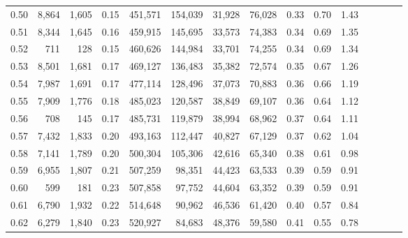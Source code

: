 \begin{tabular}{rrrcrrrrrrrrrrr}
0.50 &   8,864 &   1,605 &                                       0.15 &  451,571 &  154,039 &   31,928 &   76,028 &  0.33 &  0.70 &                         1.43 \\
0.51 &   8,344 &   1,645 &                                       0.16 &  459,915 &  145,695 &   33,573 &   74,383 &  0.34 &  0.69 &                         1.35 \\
0.52 &     711 &     128 &                                       0.15 &  460,626 &  144,984 &   33,701 &   74,255 &  0.34 &  0.69 &                         1.34 \\
0.53 &   8,501 &   1,681 &                                       0.17 &  469,127 &  136,483 &   35,382 &   72,574 &  0.35 &  0.67 &                         1.26 \\
0.54 &   7,987 &   1,691 &                                       0.17 &  477,114 &  128,496 &   37,073 &   70,883 &  0.36 &  0.66 &                         1.19 \\
0.55 &   7,909 &   1,776 &                                       0.18 &  485,023 &  120,587 &   38,849 &   69,107 &  0.36 &  0.64 &                         1.12 \\
0.56 &     708 &     145 &                                       0.17 &  485,731 &  119,879 &   38,994 &   68,962 &  0.37 &  0.64 &                         1.11 \\
0.57 &   7,432 &   1,833 &                                       0.20 &  493,163 &  112,447 &   40,827 &   67,129 &  0.37 &  0.62 &                         1.04 \\
0.58 &   7,141 &   1,789 &                                       0.20 &  500,304 &  105,306 &   42,616 &   65,340 &  0.38 &  0.61 &                         0.98 \\
0.59 &   6,955 &   1,807 &                                       0.21 &  507,259 &   98,351 &   44,423 &   63,533 &  0.39 &  0.59 &                         0.91 \\
0.60 &     599 &     181 &                                       0.23 &  507,858 &   97,752 &   44,604 &   63,352 &  0.39 &  0.59 &                         0.91 \\
0.61 &   6,790 &   1,932 &                                       0.22 &  514,648 &   90,962 &   46,536 &   61,420 &  0.40 &  0.57 &                         0.84 \\
0.62 &   6,279 &   1,840 &                                       0.23 &  520,927 &   84,683 &   48,376 &   59,580 &  0.41 &  0.55 &                         0.78 \\

\end{tabular}
